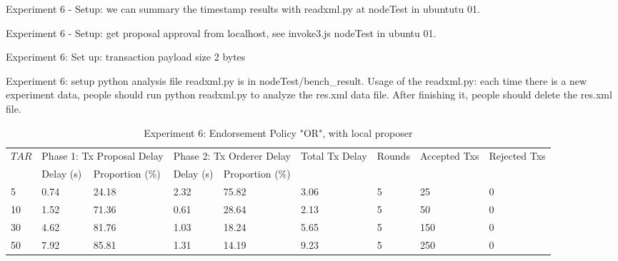 \documentclass[10pt,journal,compsoc, twoside]{IEEEtran}
\begin{document}
Experiment 6 - Setup: we can summary the timestamp results with readxml.py at nodeTest in ubuntutu 01.

Experiment 6 - Setup: get proposal approval from localhost, see invoke3.js nodeTest in ubuntu 01.

Experiment 6: Set up: transaction payload size 2 bytes

Experiment 6: setup python analysis file readxml.py is in nodeTest/bench\_result. Usage of the readxml.py: each time there is a new experiment data, people should run python readxml.py to analyze the res.xml data file. After finishing it, people should delete the res.xml file. 


\begin{table*}[htbp]
	\caption{Experiment 6: Endorsement Policy "OR", with local proposer}
	\begin{tabular}{|l|l|l|l|l|l|l|l|l|}
		\hline
		\multirow{2}{*}{$TAR$} & \multicolumn{2}{l|}{Phase 1: Tx Proposal Delay} & \multicolumn{2}{l|}{Phase 2: Tx Orderer Delay} & \multirow{2}{*}{Total Tx Delay} & \multirow{2}{*}{Rounds} & \multirow{2}{*}{Accepted Txs} & \multirow{2}{*}{Rejected Txs} \\ \cline{2-5}
		& Delay (s)           & Proportion (\%)           & Delay (s)           & Proportion (\%)          &                                 &                         &                               &                               \\ \hline
		5                      & 0.74                & 24.18                     & 2.32                & 75.82                    & 3.06                            & 5                       & 25                            & 0                             \\ \hline
		10                     & 1.52                & 71.36                     & 0.61                & 28.64                    & 2.13                            & 5                       & 50                            & 0                             \\ \hline
		30                     & 4.62                & 81.76                     & 1.03                & 18.24                    & 5.65                            & 5                       & 150                           & 0                             \\ \hline
		50                     & 7.92                & 85.81                     & 1.31                & 14.19                    & 9.23                            & 5                       & 250                           & 0                             \\ \hline

\end{tabular}
\end{table*}
\end{document}
